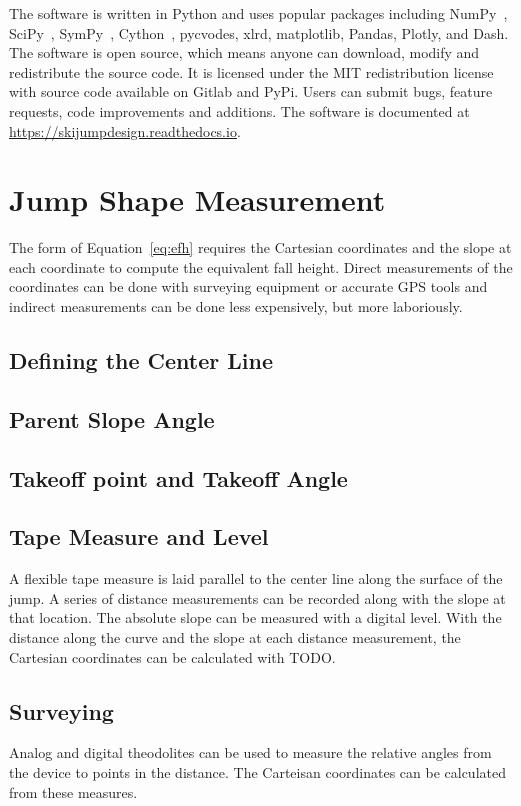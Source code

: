 \documentclass{article}
\begin{document}
The software is written in Python and uses popular packages including
NumPy~\cite{Oliphant2006}, SciPy~\cite{Virtanen2020}, SymPy~\cite{Meurer2017},
Cython~\cite{Behnel2011}, pycvodes, xlrd, matplotlib, Pandas, Plotly, and Dash.
The software is open source, which means anyone can download, modify and
redistribute the source code. It is licensed under the MIT redistribution
license with source code available on Gitlab and PyPi. Users can submit bugs,
feature requests, code improvements and additions.  The software is documented
at
\href{https://skijumpdesign.readthedocs.io}{https://skijumpdesign.readthedocs.io}.

\section{Jump Shape Measurement}
%
The form of Equation~\ref{eq:efh} requires the Cartesian coordinates and the
slope at each coordinate to compute the equivalent fall height. Direct
measurements of the coordinates can be done with surveying equipment or
accurate GPS tools and indirect measurements can be done less expensively, but
more laboriously.

\subsection{Defining the Center Line}
%

\subsection{Parent Slope Angle}
%

\subsection{Takeoff point and Takeoff Angle}
%

\subsection{Tape Measure and Level}
%
A flexible tape measure is laid parallel to the center line along the surface
of the jump. A series of distance measurements can be recorded along with the
slope at that location. The absolute slope can be measured with a digital
level. With the distance along the curve and the slope at each distance
measurement, the Cartesian coordinates can be calculated with TODO.

\subsection{Surveying}
%
Analog and digital theodolites can be used to measure the relative angles from
the device to points in the distance. The Carteisan coordinates can be
calculated from these measures.
\end{document}
